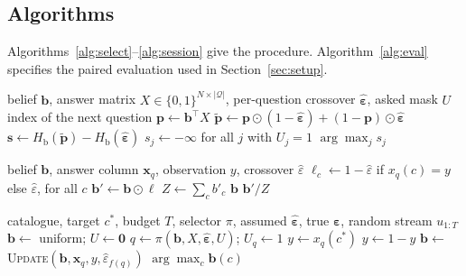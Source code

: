 \documentclass[conference]{IEEEtran}
\newcommand{\bx}{\mathbf{x}}
\newcommand{\bb}{\mathbf{b}}
\newcommand{\Hb}{H_{\mathrm{b}}}
\newcommand{\Qset}{\mathcal{Q}}
\begin{document}
\subsection{Algorithms}

Algorithms~\ref{alg:select}--\ref{alg:session} give the procedure.
Algorithm~\ref{alg:eval} specifies the paired evaluation used in
Section~\ref{sec:setup}.

\begin{algorithm}[t]
\caption{Reliability-aware query selection}
\label{alg:select}
\begin{algorithmic}[1]
\Require belief $\bb$, answer matrix $X \in \{0,1\}^{N \times |\Qset|}$,
per-question crossover $\hat{\boldsymbol\varepsilon}$, asked mask $U$
\Ensure index of the next question
\State $\mathbf{p} \gets \bb^{\!\top} X$
\State $\tilde{\mathbf{p}} \gets \mathbf{p} \odot (1-\hat{\boldsymbol\varepsilon})
   + (1-\mathbf{p}) \odot \hat{\boldsymbol\varepsilon}$
\State $\mathbf{s} \gets \Hb(\tilde{\mathbf{p}}) - \Hb(\hat{\boldsymbol\varepsilon})$
\State $s_j \gets -\infty$ for all $j$ with $U_j = 1$
\State \Return $\arg\max_j s_j$
\end{algorithmic}
\end{algorithm}

\begin{algorithm}[t]
\caption{Belief update under BSC$(\hat\varepsilon)$}
\label{alg:update}
\begin{algorithmic}[1]
\Require belief $\bb$, answer column $\bx_q$, observation $y$, crossover $\hat\varepsilon$
\State $\ell_c \gets 1-\hat\varepsilon$ if $x_q(c)=y$ else $\hat\varepsilon$, for all $c$
\State $\bb' \gets \bb \odot \boldsymbol\ell$
\State $Z \gets \sum_c b'_c$
 
  \State \Return $\bb$ 
\EndIf
\State \Return $\bb' / Z$
\end{algorithmic}
\end{algorithm}

\begin{algorithm}[t]
\caption{Identification session}
\label{alg:session}
\begin{algorithmic}[1]
\Require catalogue, target $c^\ast$, budget $T$, selector $\pi$,
assumed $\hat{\boldsymbol\varepsilon}$, true $\boldsymbol\varepsilon$,
random stream $u_{1:T}$
\State $\bb \gets$ uniform; $U \gets \mathbf{0}$
  \State $q \gets \pi(\bb, X, \hat{\boldsymbol\varepsilon}, U)$; $U_q \gets 1$
  \State $y \gets x_q(c^\ast)$
   $y \gets 1-y$  \EndIf
  \State $\bb \gets$ \textsc{Update}$(\bb, \bx_q, y, \hat\varepsilon_{f(q)})$
\EndFor
\State \Return $\arg\max_c \bb(c)$
\end{algorithmic}
\end{algorithm}
\end{document}
